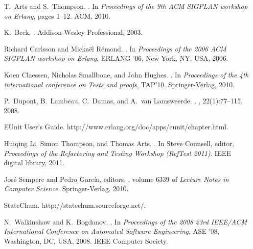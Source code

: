 \documentclass[]{sigplanconf}
\begin{document}
\begin{thebibliography}{10}

T.~Arts and S.~Thompson.
.
\newblock In {\em Proceedings of the 9th ACM SIGPLAN workshop on Erlang}, pages
  1--12. ACM, 2010.

\vfill\eject
{}
K.~Beck.
.
\newblock Addison-Wesley Professional, 2003.

Richard Carlsson and Micka\"{e}l R\'{e}mond.
.
\newblock In {\em {Proceedings of the 2006 ACM SIGPLAN workshop on Erlang}},
  ERLANG '06, New York, NY, USA, 2006.

Koen Claessen, Nicholas Smallbone, and John Hughes.
.
\newblock In {\em {Proceedings of the 4th international conference on Tests and
  proofs}}, TAP'10. Springer-Verlag, 2010.

P.~Dupont, B.~Lambeau, C.~Damas, and A.~van Lamsweerde.
.
, 22(1):77--115, 2008.

{EUnit User's Guide}.
\newblock http://www.erlang.org/doc/apps/eunit/chapter.html.

Huiqing Li, Simon Thompson, and Thomas Arts.
.
\newblock In Steve Counsell, editor, {\em Proceedings of the Refactoring and
  Testing Workshop (RefTest 2011)}. IEEE digital library, 2011.

José Sempere and Pedro García, editors.
, volume 6339 of
  {\em Lecture Notes in Computer Science}.
\newblock Springer-Verlag, 2010.

{StateChum}.
\newblock http://statechum.sourceforge.net/.

N.~Walkinshaw and K.~Bogdanov.
.
\newblock In {\em {Proceedings of the 2008 23rd IEEE/ACM International
  Conference on Automated Software Engineering}}, ASE '08, Washington, DC, USA,
  2008. IEEE Computer Society.


\end{thebibliography}
\end{document}
